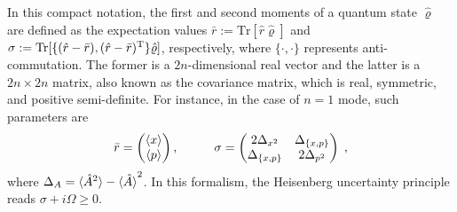 \documentclass[%
reprint,
superscriptaddress,
nofootinbib,
 amsmath,amssymb,
prx,
floatfix,
]{revtex4-2}
\begin{document}
In this compact notation, the first and second moments of a quantum state $\hat{\varrho}$ are defined as the expectation values $\bar{r} := \text{Tr} [ \hat{r} \hat{\varrho}]$ and $\sigma := \text{Tr} [ \{ (\hat{r}-\bar{r}), (\hat{r}-\bar{r})^{\rm T} \} \hat{\varrho} ] $, respectively, where $\{ \cdot, \cdot \}$ represents anti-commutation. The former is a $2n$-dimensional real vector and the latter is a $2n \times 2n$ matrix, also known as the covariance matrix, which is real, symmetric, and positive semi-definite. For instance, in the case of $n=1$ mode, such parameters are
\begin{equation}
\label{eq:def_first_second}
    \bar{r}  = \begin{pmatrix}
        \braket{x}\\
        \braket{p}
    \end{pmatrix} , \hspace{1cm}
    \sigma = \begin{pmatrix}
        2\Delta_{x^2} & \Delta_{\{x,p\}} \\
        \Delta_{\{x,p\}} & 2\Delta_{p^2}
    \end{pmatrix} \;,
\end{equation}
where $\Delta_A = \braket{\hat{A}^2} - \braket{\hat{A}}^2$. In this formalism, the Heisenberg uncertainty principle reads $\sigma + i \Omega \geq 0$.
 
\end{document}
